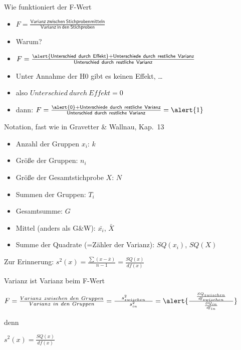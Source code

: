 \begin{frame}
  {Wie funktioniert der F-Wert}
  \begin{itemize}[<+->]
    \item $F=\frac{\mathsf{Varianz\ zwischen\ Stichprobenmitteln}}{\mathsf{Varianz\ in\ den\ Stichproben}}$
    \Zeile
    \item Warum?
    \item $F=\frac{\mathsf{\alert{Unterschied\ durch\ Effekt}+Unterschiede\ durch\ restliche\ Varianz}}{\mathsf{Unterschied\ durch\ restliche\ Varianz}}$
    \Zeile
    \item Unter Annahme der H0 gibt es keinen Effekt, \ldots
    \item also \alert{$Unterschied\ durch\ Effekt=0$}
    \Zeile
    \item dann: $F=\frac{\mathsf{\alert{0}+Unterschiede\ durch\ restliche\ Varianz}}{\mathsf{Unterschied\ durch\ restliche\ Varianz}}=\alert{1}$
  \end{itemize}
\end{frame}

\begin{frame}
  {Notation, fast wie in Gravetter \& Wallnau, Kap.~13}
  \begin{itemize}[<+->]
    \item Anzahl der Gruppen \alert{$x_i$}: \alert{$k$}
    \item Größe der Gruppen: \alert{$n_i$}
    \item Größe der Gesamtstichprobe \alert{$X$}: \alert{$N$}
    \item Summen der Gruppen: \alert{$T_i$}
    \item Gesamtsumme: \alert{$G$}
    \item Mittel (anders als G\&W): \alert{$\bar{x_i}$}, \alert{$\bar{X}$}
    \item Summe der Quadrate (=Zähler der Varianz): \alert{$SQ(x_i)$}, \alert{$SQ(X)$}
  \end{itemize}
  \pause
  \vspace{0.5cm}
  Zur Erinnerung: $s^2(x)=\frac{\sum (x-\bar{x})}{n-1}=\frac{SQ(x)}{df(x)}$\\
\end{frame}

\begin{frame}
  {Varianz ist Varianz beim F-Wert}
  \begin{center}
    $F=\frac{Varianz\ zwischen\ den\ Gruppen}{Varianz\ in\ den\ Gruppen}=\frac{\ \ \ s^2_{zwischen}\ \ \ }{s^2_{in}}=\alert{\frac{\ \ \ \frac{SQ_{zwischen}}{df_{zwischen}}\ \ \ }{\frac{SQ_{in}}{df_{in}}}}$\\
    \vspace{0.5cm}

    denn\\
    \vspace{0.5cm}

    $s^2(x)=\frac{SQ(x)}{df(x)}$
  \end{center}
\end{frame}

